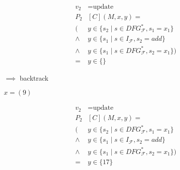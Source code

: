 \begin{minipage}{4.75cm}
    \begin{graybox}
        \footnotesize
        \setlength{\abovedisplayskip}{0pt}
        \setlength{\belowdisplayskip}{0pt}
        \vspace{-0.5em}
        \begin{align*}
            v_2&{}=\text{update}\\
            P_2&{}[C](M,x,y)=\\
              (&y\in\{s_2\mid s\in DFG_\mathcal{F}^*,s_1=x_1\}\\
                \mathrel\land{}&y\in\{s_1\mid s\in I_\mathcal{F},s_2=add\}\\
                \mathrel\land{}&y\in\{s_1\mid s\in DFG_\mathcal{F}^*,s_2=x_1\})\\
               ={}&y\in\{\}
        \end{align*}
    \end{graybox}
    {\large $\implies$ backtrack}
\end{minipage}
\begin{minipage}{4.75cm}
    \centering
    {\large\phantom{$(9)$}$x=(9)$\phantom{$x$}}
    \begin{graybox}
        \footnotesize
        \setlength{\abovedisplayskip}{0pt}
        \setlength{\belowdisplayskip}{0pt}
        \vspace{-0.5em}
        \begin{align*}
            v_2&{}=\text{update}\\
            P_2&{}[C](M,x,y)=\\
              (&y\in\{s_2\mid s\in DFG_\mathcal{F}^*,s_1=x_1\}\\
                \mathrel\land{}&y\in\{s_1\mid s\in I_\mathcal{F},s_2=add\}\\
                \mathrel\land{}&y\in\{s_1\mid s\in DFG_\mathcal{F}^*,s_2=x_1\})\\
               ={}&y\in\{17\}
        \end{align*}
    \end{graybox}
    \vspace{-0.75em}
    \hspace{1cm}
    {\Huge{}}
    \hspace{1cm}
\end{minipage}

